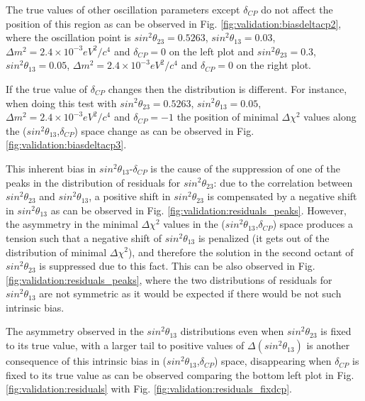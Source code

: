 \begin{itemize}
{The true values of other oscillation parameters except $\delta_{CP}$ do not affect the position of this region 
as can be observed in Fig. \ref{fig:validation:biasdeltacp2}, where the oscillation point is 
 $sin^{2}\theta_{23} = 0.5263$, $sin^{2}\theta_{13} = 0.03$, $\Delta m^{2} = 2.4 \times 10^{-3} eV^{2}/c^{4}$ and $\delta_{CP} = 0$ on the left plot
and $sin^{2}\theta_{23} = 0.3$, $sin^{2}\theta_{13} = 0.05$, $\Delta m^{2} = 2.4 \times 10^{-3} eV^{2}/c^{4}$ and $\delta_{CP} = 0$ on the right plot. 

If the true value of $\delta_{CP}$ changes then the distribution is different. For instance, when doing this test with
$sin^{2}\theta_{23} = 0.5263$, $sin^{2}\theta_{13} = 0.05$, $\Delta m^{2} = 2.4 \times 10^{-3} eV^{2}/c^{4}$ and $\delta_{CP} = -1$
the position of minimal $\Delta\chi^{2}$ values along the ($sin^{2}\theta_{13}$,$\delta_{CP}$) space change as can be observed in Fig. \ref{fig:validation:biasdeltacp3}.

This inherent bias in $sin^{2}\theta_{13}$-$\delta_{CP}$ is the cause of the suppression of one of the peaks in the distribution of residuals for $sin^{2}\theta_{23}$: 
due to the correlation between $sin^{2}\theta_{23}$ and $sin^{2}\theta_{13}$, a positive shift in $sin^{2}\theta_{23}$ is compensated by a negative
shift in $sin^{2}\theta_{13}$ as can be observed in Fig. \ref{fig:validation:residuals_peaks}. However, the asymmetry in the minimal $\Delta\chi^{2}$
values in the ($sin^{2}\theta_{13}$,$\delta_{CP}$) space produces a tension such that a negative shift of $sin^{2}\theta_{13}$ is penalized (it gets out of the distribution of minimal $\Delta\chi^{2}$),
and therefore the solution in the second octant of $sin^{2}\theta_{23}$ is suppressed due to this fact.
This can be also observed in Fig. \ref{fig:validation:residuals_peaks}, where the two distributions of residuals for $sin^{2}\theta_{13}$ are not symmetric
as it would be expected if there would be not such intrinsic bias. 

The asymmetry observed in the $sin^{2}\theta_{13}$ distributions even when $sin^{2}\theta_{23}$ is fixed to its true value, with a larger tail
to positive values of $\Delta(sin^{2}\theta_{13})$ is another consequence of this intrinsic bias in ($sin^{2}\theta_{13}$,$\delta_{CP}$) space, disappearing when $\delta_{CP}$ is fixed to
its true value as can be observed comparing the bottom left plot in Fig. \ref{fig:validation:residuals} with Fig. \ref{fig:validation:residuals_fixdcp}.

}



\end{itemize}

